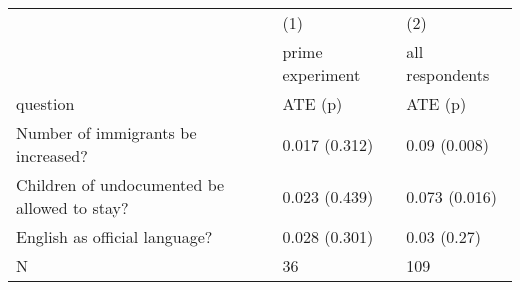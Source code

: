\begin{tabular}{lll}
  \hline
  \hline
 & (1) & (2) \\ 
   & prime experiment & all respondents \\ 
  question & ATE (p) & ATE (p) \\ 
  Number of immigrants be increased? & 0.017 (0.312) & 0.09 (0.008) \\ 
  Children of undocumented be allowed to stay? & 0.023 (0.439) & 0.073 (0.016) \\ 
  English as official language? & 0.028 (0.301) & 0.03 (0.27) \\ 
  N & 36 & 109 \\ 
   \hline
\end{tabular}
